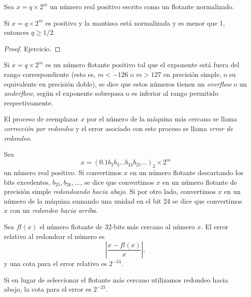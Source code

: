 Sea $x = q \times 2^m$ un número real positivo escrito como un flotante normalizado.

\begin{proposition}
  Si $x = q \times 2^m$ es positivo y la mantissa está normalizada y es menor que 1, entonces $q \geq 1/2$.
\end{proposition}

\begin{proof}
  Ejercicio.
\end{proof}

\begin{definition}
Si $x = q \times 2^m$ es un número flotante positivo tal que el exponente está fuera del rango correspondiente (esto es, $m < -126$ o $m > 127$ en precisión simple, o su equivalente en precisión doble), se dice que estos números tienen un \emph{overflow} o un \emph{underflow}, según el exponente sobrepasa o es inferior al rango permitido respectivamente.  
\end{definition}

\begin{definition}
  El proceso de reemplazar $x$ por el número de la máquina más cercano se llama \emph{corrección por redondeo} y el error asociado con este proceso se llama \emph{error de redondeo}.
\end{definition}

\begin{definition}
  Sea 
\[x = (0.1b_2b_3\ldots b_{24}b_{25}\ldots)_2\times 2^m\]
un número real positivo. Si convertimos $x$ en un número flotante descartando los bits excedentes, $b_{25}, b_{26}, \ldots$, se dice que convertimos $x$ en un número flotante de precisión simple \emph{redondeando hacia abajo}. Si por otro lado, convertimos $x$ en un número de la máquina sumando una unidad en el bit 24 se dice que convertimos $x$ con un \emph{redondeo hacia arriba}.
\end{definition}

\begin{theorem}
  Sea $fl(x)$ el número flotante de 32-bits más cercano al número $x$. El error relativo al redondear el número es 
\[\left|\frac{x - fl(x)}{x}\right|,\]
y una cota para el error relativo es $2^{-24}$.
\end{theorem}

\begin{theorem}
  Si en lugar de seleccionar el flotante más cercano utilizamos redondeo hacia abajo, la cota para el error es $2^{-23}$.
\end{theorem}


